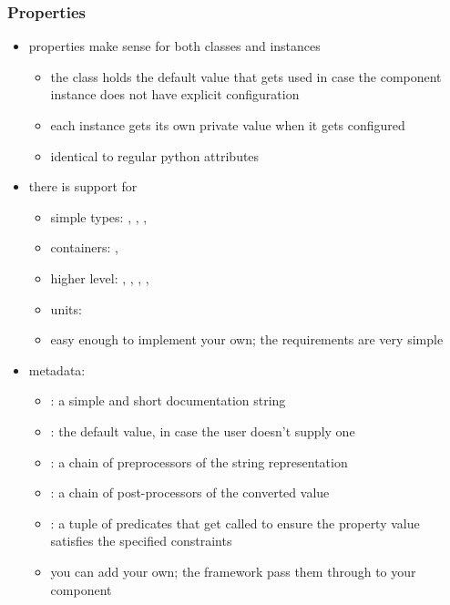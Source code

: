 \begin{frame}[fragile]
%
  \frametitle{Properties}
%
  \begin{itemize}
%
  \item properties make sense for both classes and instances
    \begin{itemize}
    \item the class holds the default value that gets used in case the component instance does
      not have explicit configuration
    \item each instance gets its own private value when it gets configured
    \item identical to regular python attributes
    \end{itemize}
%
  \item there is support for 
    \begin{itemize}
    \item simple types: , , , 
    \item containers: , 
    \item higher level: , , ,
      , 
    \item units: 
    \item easy enough to implement your own; the requirements are very simple
    \end{itemize}
%
  \item metadata:
    \begin{itemize}
    \item {}: a simple and short documentation string
    \item {}: the default value, in case the user doesn't supply one
    \item {}: a chain of preprocessors of the string representation
    \item {}: a chain of post-processors of the converted value
    \item {}: a tuple of predicates that get called to ensure the property
      value satisfies the specified constraints
    \item you can add your own; the framework pass them through to your component
    \end{itemize}
%
  \end{itemize}
%
\end{frame}

